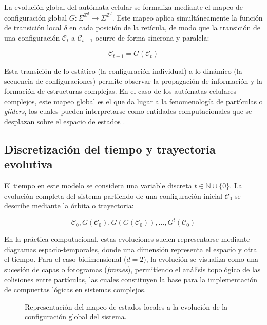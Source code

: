 La evolución global del autómata celular se formaliza mediante el mapeo de configuración global $G: \Sigma^{\mathbb{Z}^d} \to \Sigma^{\mathbb{Z}^d}$. Este mapeo aplica simultáneamente la función de transición local $\delta$ en cada posición de la retícula, de modo que la transición de una configuración $\mathcal{C}_t$ a $\mathcal{C}_{t+1}$ ocurre de forma síncrona y paralela:

\begin{equation}
    \mathcal{C}_{t+1} = G(\mathcal{C}_t)
\end{equation}

Esta transición de lo estático (la configuración individual) a lo dinámico (la secuencia de configuraciones) permite observar la propagación de información y la formación de estructuras complejas. En el caso de los autómatas celulares complejos, este mapeo global es el que da lugar a la fenomenología de partículas o \textit{gliders}, los cuales pueden interpretarse como entidades computacionales que se desplazan sobre el espacio de estados \cite{Wolfram2002}.

\subsection{Discretización del tiempo y trayectoria evolutiva}

El tiempo en este modelo se considera una variable discreta $t \in \mathbb{N} \cup \{0\}$. La evolución completa del sistema partiendo de una configuración inicial $\mathcal{C}_0$ se describe mediante la órbita o trayectoria:

\begin{equation}
    \mathcal{C}_0, G(\mathcal{C}_0), G(G(\mathcal{C}_0)), \dots, G^t(\mathcal{C}_0)
\end{equation}

En la práctica computacional, estas evoluciones suelen representarse mediante diagramas espacio-temporales, donde una dimensión representa el espacio y otra el tiempo. Para el caso bidimensional ($d=2$), la evolución se visualiza como una sucesión de capas o fotogramas (\textit{frames}), permitiendo el análisis topológico de las colisiones entre partículas, las cuales constituyen la base para la implementación de compuertas lógicas en sistemas complejos.

\begin{figure}[h]
\centering
\caption{Representación del mapeo de estados locales a la evolución de la configuración global del sistema.}
\label{fig:mapeo_global}
\end{figure}



